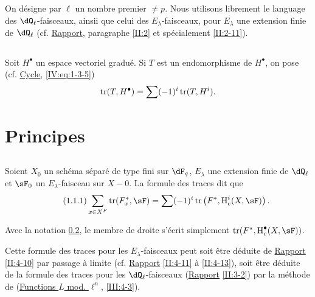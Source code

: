 \subsection{}\label{VI:0-2}

On d\'esigne par $\ell$ un nombre premier $\ne p$. Nous utilisons librement le 
language des $\dQ_\ell$-faisceaux, ainsii que celui des $E_\lambda$-faisceaux, 
pour $E_\lambda$ une extension finie de $\dQ_\ell$ (cf. \hyperref[II]{Rapport}, 
paragraphe \ref{II:2} et sp\'ecialement \ref{II:2-11}). 





\subsection{}\label{VI:0-3}

Soit $H^\bullet$ un espace vectoriel gradu\'e. Si $T$ est un endomorphisme de 
$H^\bullet$, on pose (cf. \hyperref[IV]{Cycle}, \ref{IV:eq:1-3-5}) 
\[
  \operatorname{tr}(T,H^\bullet) = \sum (-1)^i \operatorname{tr}(T,H^i) \text{.}
\]










\section{Principes}\label{VI:1}





\subsection{}\label{VI:1-1}

Soient $X_0$ un sch\'ema s\'epar\'e de type fini sur $\dF_q$, $E_\lambda$ une 
extension finie de $\dQ_\ell$ et $\sF_0$ un $E_\lambda$-faisceau sur $X-0$. La 
formule des traces dit que 
\begin{equation*}\tag{1.1.1}\label{VI:eq:1-1-1}
  \sum_{x\in X^F} \tr(F_x^\ast,\sF) = \sum (-1)^i \tr\left(F^\ast,\h_c^i(X,\sF)\right) \text{.}
\end{equation*}

Avec la notation \ref{VI:0-3}, le membre de droite s'\'ecrit simplement 
$\tr(F^\ast,\h_c^\bullet(X,\sF))$. 

Cette formule des traces pour les $E_\lambda$-faisceaux peut soit \^etre 
d\'eduite de \hyperref[II]{Rapport} \ref{II:4-10} par passage \`a limite (cf. 
\hyperref[II]{Rapport} \ref{II:4-11} \`a \ref{II:4-13}), soit \^etre d\'eduite 
de la formule des traces pour les $\dQ_\ell$-faisceaux (\hyperref[II]{Rapport} 
\ref{II:3-2}) par la m\'ethode de (\hyperref[III]{Functions $L$ mod. $\ell^n$}, 
\ref{III:4-3}). 

